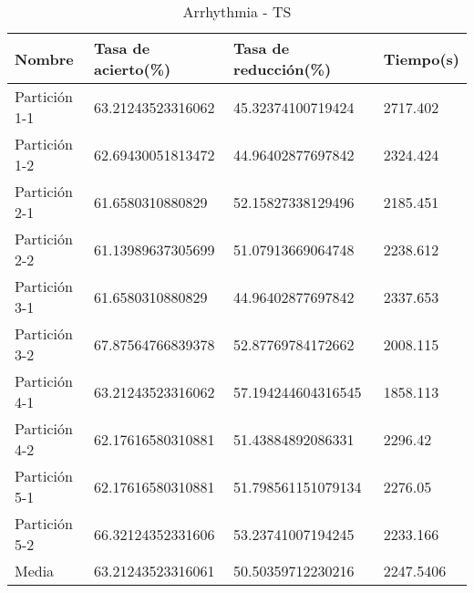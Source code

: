 \begin{table}[]
	\centering
	\caption{Arrhythmia - TS}
	\label{ARRH-TS}
	\begin{tabular}{l|lll}
		Nombre        & Tasa de acierto(\%) & Tasa de reducción(\%) & Tiempo(s) \\ \hline
		Partición 1-1 & 63.21243523316062   & 45.32374100719424     & 2717.402  \\
		Partición 1-2 & 62.69430051813472   & 44.96402877697842     & 2324.424  \\
		Partición 2-1 & 61.6580310880829    & 52.15827338129496     & 2185.451  \\
		Partición 2-2 & 61.13989637305699   & 51.07913669064748     & 2238.612  \\
		Partición 3-1 & 61.6580310880829    & 44.96402877697842     & 2337.653  \\
		Partición 3-2 & 67.87564766839378   & 52.87769784172662     & 2008.115  \\
		Partición 4-1 & 63.21243523316062   & 57.194244604316545    & 1858.113  \\
		Partición 4-2 & 62.17616580310881   & 51.43884892086331     & 2296.42   \\
		Partición 5-1 & 62.17616580310881   & 51.798561151079134    & 2276.05   \\
		Partición 5-2 & 66.32124352331606   & 53.23741007194245     & 2233.166  \\ \hline
		Media         & 63.21243523316061   & 50.50359712230216     & 2247.5406
	\end{tabular}
\end{table}